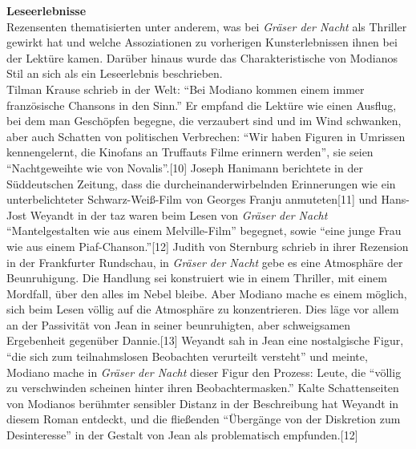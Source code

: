 \documentclass[fontsize=12pt]{scrartcl}
\begin{document}
\textbf{Leseerlebnisse}\\
Rezensenten thematisierten unter anderem, was bei \textit{Gr\"aser der Nacht} als Thriller gewirkt hat und welche Assoziationen zu vorherigen Kunsterlebnissen ihnen bei der Lekt\"ure kamen. Dar\"uber hinaus wurde das Charakteristische von Modianos Stil an sich als ein Leseerlebnis beschrieben.\\
Tilman Krause schrieb in der Welt: "`Bei Modiano kommen einem immer franz\"osische Chansons in den Sinn."' Er empfand die Lekt\"ure wie einen Ausflug, bei dem man Gesch\"opfen begegne, die verzaubert sind und im Wind schwanken, aber auch Schatten von politischen Verbrechen: "`Wir haben Figuren in Umrissen kennengelernt, die Kinofans an Truffauts Filme erinnern werden"', sie seien "`Nachtgeweihte wie von Novalis"'.[10] Joseph Hanimann berichtete in der S\"uddeutschen Zeitung, dass die durcheinanderwirbelnden Erinnerungen wie ein unterbelichteter Schwarz-Wei{\ss}-Film von Georges Franju anmuteten[11] und Hans-Jost Weyandt in der taz waren beim Lesen von \textit{Gr\"aser der Nacht} "`Mantelgestalten wie aus einem Melville-Film"' begegnet, sowie "`eine junge Frau wie aus einem Piaf-Chanson."'[12]
Judith von Sternburg schrieb in ihrer Rezension in der Frankfurter Rundschau, in \textit{Gr\"aser der Nacht} gebe es eine Atmosph\"are der Beunruhigung. Die Handlung sei konstruiert wie in einem Thriller, mit einem Mordfall, \"uber den alles im Nebel bleibe. Aber Modiano mache es einem m\"oglich, sich beim Lesen v\"ollig auf die Atmosph\"are zu konzentrieren. Dies l\"age vor allem an der Passivit\"at von Jean in seiner beunruhigten, aber schweigsamen Ergebenheit gegen\"uber Dannie.[13] Weyandt sah in Jean eine nostalgische Figur, "`die sich zum teilnahmslosen Beobachten verurteilt versteht"' und meinte, Modiano mache in \textit{Gr\"aser der Nacht} dieser Figur den Prozess: Leute, die "`v\"ollig zu ver\-schwin\-den scheinen hinter ihren Beobachtermasken."' Kalte Schattensei\-ten von Modianos ber\"uhmter sensibler Distanz in der Beschreibung hat Weyandt in diesem Roman entdeckt, und die flie{\ss}enden "`\"Uberg\"ange von der Diskretion zum Des\-inte\-resse"' in der Gestalt von Jean als pro\-ble\-ma\-tisch empfunden.[12]\\
\end{document}
